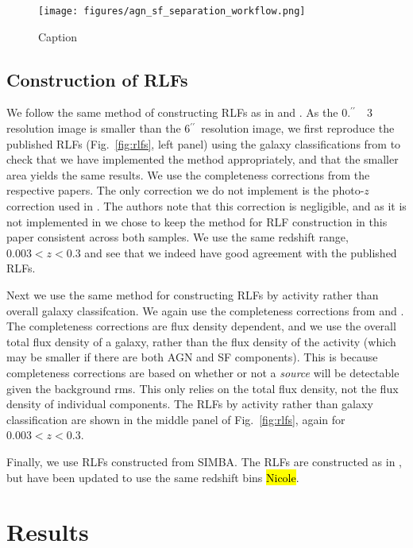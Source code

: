 \documentclass[usenatbib,fleqn,letters]{mnras}
\newcommand{\sarc}{$^{\prime\prime}\!\!$}
\begin{document}
\begin{figure}
    \centering
    \texttt{[image: figures/agn\_sf\_separation\_workflow.png]}
    \caption{Caption}
    \label{fig:flowchart}
\end{figure}

\subsection{Construction of RLFs}

We follow the same method of constructing RLFs as in \cite{kondapally_cosmic_2022} and \cite{cochrane_lofar_2023}. As the 0.\sarc\ \ 3 resolution image is smaller than the 6\sarc\ resolution image, we first reproduce the published RLFs (Fig.~\ref{fig:rlfs}, left panel) using the galaxy classifications from  to check that we have implemented the method appropriately, and that the smaller area yields the same results. We use the completeness corrections from the respective papers. The only correction we do not implement is the photo-$z$ correction used in \cite{cochrane_lofar_2023}. The authors note that this correction is negligible, and as it is not implemented in \cite{kondapally_cosmic_2022} we chose to keep the method for RLF construction in this paper consistent across both samples. We use the same redshift range, $0.003 < z < 0.3$ and see that we indeed have good agreement with the published RLFs.

Next we use the same method for constructing RLFs by activity rather than overall galaxy classifcation. We again use the completeness corrections from \cite{cochrane_lofar_2023} and \cite{kondapally_cosmic_2022}. The completeness corrections are flux density dependent, and we use the overall total flux density of a galaxy, rather than the flux density of the activity (which may be smaller if there are both AGN and SF components). This is because completeness corrections are based on whether or not a \textit{source} will be detectable given the background rms. This only relies on the total flux density, not the flux density of individual components. The RLFs by activity rather than galaxy classification are shown in the middle panel of Fig.~\ref{fig:rlfs}, again for  $0.003 < z < 0.3$. 

Finally, we use RLFs constructed from SIMBA. The RLFs are constructed as in \cite{thomson_radio_2019}, but have been updated to use the same redshift bins \hl{Nicole}. 

\section{Results}
\end{document}
